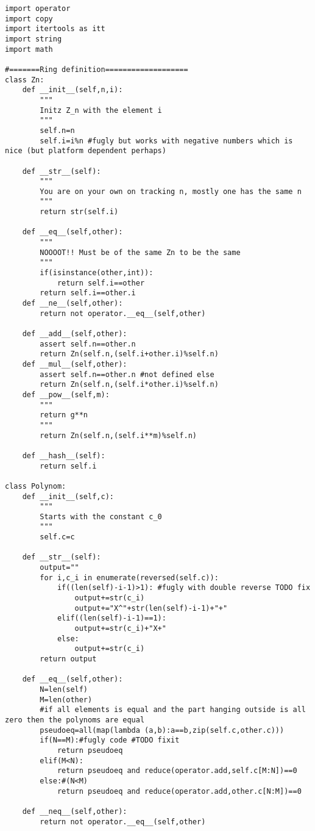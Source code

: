 \documentclass[a4paper,twoside=false,abstract=false,numbers=noenddot,
titlepage=false,headings=small,parskip=half,version=last]{scrartcl}
\theoremstyle{definition}
\theoremstyle{remark}
\begin{document}
\begin{verbatim}
import operator
import copy
import itertools as itt
import string
import math

#=======Ring definition===================
class Zn:
    def __init__(self,n,i):
        """
        Initz Z_n with the element i
        """
        self.n=n
        self.i=i%n #fugly but works with negative numbers which is nice (but platform dependent perhaps)

    def __str__(self):
        """
        You are on your own on tracking n, mostly one has the same n
        """
        return str(self.i)

    def __eq__(self,other):
        """
        NOOOOT!! Must be of the same Zn to be the same
        """
        if(isinstance(other,int)):
            return self.i==other
        return self.i==other.i
    def __ne__(self,other):
        return not operator.__eq__(self,other)
    
    def __add__(self,other):
        assert self.n==other.n
        return Zn(self.n,(self.i+other.i)%self.n)
    def __mul__(self,other):
        assert self.n==other.n #not defined else
        return Zn(self.n,(self.i*other.i)%self.n)
    def __pow__(self,m):
        """
        return g**n
        """
        return Zn(self.n,(self.i**m)%self.n)
    
    def __hash__(self):
        return self.i

class Polynom:
    def __init__(self,c):
        """
        Starts with the constant c_0
        """
        self.c=c

    def __str__(self):
        output=""
        for i,c_i in enumerate(reversed(self.c)):
            if((len(self)-i-1)>1): #fugly with double reverse TODO fix
                output+=str(c_i)
                output+="X^"+str(len(self)-i-1)+"+"
            elif((len(self)-i-1)==1):
                output+=str(c_i)+"X+"
            else:
                output+=str(c_i)
        return output

    def __eq__(self,other):
        N=len(self)
        M=len(other)
        #if all elements is equal and the part hanging outside is all zero then the polynoms are equal
        pseudoeq=all(map(lambda (a,b):a==b,zip(self.c,other.c)))
        if(N==M):#fugly code #TODO fixit 
            return pseudoeq 
        elif(M<N):
            return pseudoeq and reduce(operator.add,self.c[M:N])==0
        else:#(N<M)
            return pseudoeq and reduce(operator.add,other.c[N:M])==0

    def __neq__(self,other):
        return not operator.__eq__(self,other)


\end{verbatim}
\end{document}
